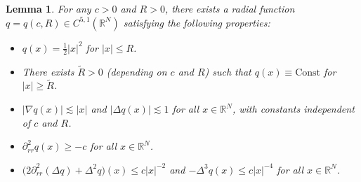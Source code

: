 \documentclass[a4paper,two-side,10pt]{amsart}
\newtheorem{lem}{Lemma}[section]
\newcommand{\R}{\mathbb{R}}
\numberwithin{equation}{section}
\begin{document}
\begin{lem}
\label{lemconsq}
For any $c>0$ and $R>0$, there exists a radial function $q=q(c,R) \in C^{5,1} (\R^N)$ satisfying the following properties:
\begin{itemize}
\item[(1)] $q(x)= \frac{1}{2} |x|^2$ for $|x|\leq R$.
\item[(2)] There exists $\tilde{R}>0$ (depending on $c$ and $R$) such that $q(x) \equiv \text{Const}$ for $|x|\geq \tilde{R}$.
\item[(3)] $|\nabla q (x)|\lesssim |x|$ and $|\Delta q(x) | \lesssim 1 $ for all $x\in \R^N$, with constants independent of $c$ and $R$.
\item[(4)] $\partial_{rr}^2 q(x) \geq - c$ for all $x\in \R^N$. %
\item[(5)] $\big(2\partial_{rr}^2(\Delta q)+\Delta^2 q\big)(x) \leq c |x|^{-2}$ and $-\Delta^3 q (x) \leq c |x|^{-4} $  for all $x\in \R^N$.
\end{itemize}
\end{lem}
\end{document}
